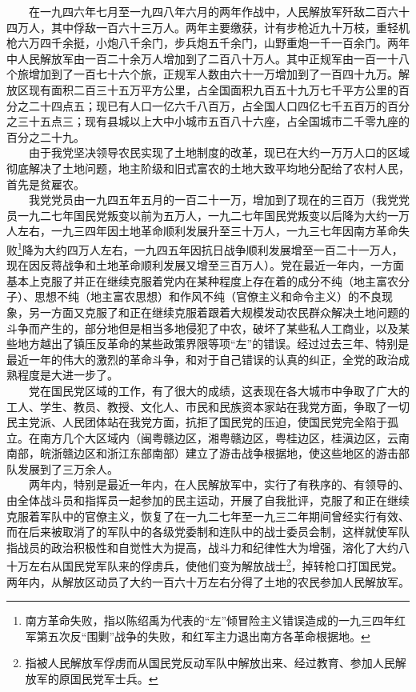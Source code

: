 \documentclass[cn,11pt,chinese]{elegantbook}
\begin{document}
　　在一九四六年七月至一九四八年六月的两年作战中，人民解放军歼敌二百六十四万人，其中俘敌一百六十三万人。两年主要缴获，计有步枪近九十万枝，重轻机枪六万四千余挺，小炮八千余门，步兵炮五千余门，山野重炮一千一百余门。两年中人民解放军由一百二十余万人增加到了二百八十万人。其中正规军由一百一十八个旅增加到了一百七十六个旅，正规军人数由六十一万增加到了一百四十九万。解放区现有面积二百三十五万平方公里，占全国面积九百五十九万七千平方公里的百分之二十四点五；现已有人口一亿六千八百万，占全国人口四亿七千五百万的百分之三十五点三；现有县城以上大中小城市五百八十六座，占全国城市二千零九座的百分之二十九。\\
　　由于我党坚决领导农民实现了土地制度的改革，现已在大约一万万人口的区域彻底解决了土地问题，地主阶级和旧式富农的土地大致平均地分配给了农村人民，首先是贫雇农。\\
　　我党党员由一九四五年五月的一百二十一万，增加到了现在的三百万（我党党员一九二七年国民党叛变以前为五万人，一九二七年国民党叛变以后降为大约一万人左右，一九三四年因土地革命顺利发展升至三十万人，一九三七年因南方革命失败\footnote[2]{ 南方革命失败，指以陈绍禹为代表的“左”倾冒险主义错误造成的一九三四年红军第五次反“围剿”战争的失败，和红军主力退出南方各革命根据地。}降为大约四万人左右，一九四五年因抗日战争顺利发展增至一百二十一万人，现在因反蒋战争和土地革命顺利发展又增至三百万人）。党在最近一年内，一方面基本上克服了并正在继续克服着党内在某种程度上存在着的成分不纯（地主富农分子）、思想不纯（地主富农思想）和作风不纯（官僚主义和命令主义）的不良现象，另一方面又克服了和正在继续克服着跟着大规模发动农民群众解决土地问题的斗争而产生的，部分地但是相当多地侵犯了中农，破坏了某些私人工商业，以及某些地方越出了镇压反革命的某些政策界限等项“左”的错误。经过过去三年、特别是最近一年的伟大的激烈的革命斗争，和对于自己错误的认真的纠正，全党的政治成熟程度是大进一步了。\\
　　党在国民党区域的工作，有了很大的成绩，这表现在各大城市中争取了广大的工人、学生、教员、教授、文化人、市民和民族资本家站在我党方面，争取了一切民主党派、人民团体站在我党方面，抗拒了国民党的压迫，使国民党完全陷于孤立。在南方几个大区域内（闽粤赣边区，湘粤赣边区，粤桂边区，桂滇边区，云南南部，皖浙赣边区和浙江东部南部）建立了游击战争根据地，使这些地区的游击部队发展到了三万余人。\\
　　两年内，特别是最近一年内，在人民解放军中，实行了有秩序的、有领导的、由全体战斗员和指挥员一起参加的民主运动，开展了自我批评，克服了和正在继续克服着军队中的官僚主义，恢复了在一九二七年至一九三二年期间曾经实行有效、而在后来被取消了的军队中的各级党委制和连队中的战士委员会制，这样就使军队指战员的政治积极性和自觉性大为提高，战斗力和纪律性大为增强，溶化了大约八十万左右从国民党军队来的俘虏兵，使他们变为解放战士\footnote[3]{ 指被人民解放军俘虏而从国民党反动军队中解放出来、经过教育、参加人民解放军的原国民党军士兵。}，掉转枪口打国民党。两年内，从解放区动员了大约一百六十万左右分得了土地的农民参加人民解放军。\\
\end{document}
